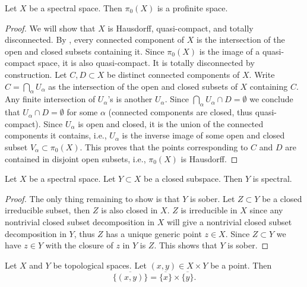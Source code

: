 \begin{lemma}
  \label{thm:pi0-profinite}
  Let $X$ be a spectral space. Then $\pi_0(X)$ is a profinite space.
\end{lemma}

\begin{proof}
  We will show that \(X\) is Hausdorff, quasi-compact, and totally disconnected.
  By , every connected component of \(X\) is the intersection of the open and closed subsets containing it. Since \(\pi_0(X)\) is the image of a quasi-compact space, it is also quasi-compact. It is totally disconnected by construction. Let \(C,D \subset X\) be distinct connected components of \(X\). Write \(C = \bigcap_{\alpha} U_\alpha\) as the intersection of the open and closed subsets of \(X\) containing \(C\). Any finite intersection of \(U_\alpha\)'s is another \(U_\alpha\). Since \(\bigcap_\alpha U_\alpha \cap D = \emptyset\) we conclude that \(U_\alpha \cap D = \emptyset\) for some \(\alpha\) (connected components are closed, thus quasi-compact). Since \(U_\alpha\) is open and closed, it is the union of the connected components it contains, i.e., \(U_\alpha\) is the inverse image of some open and closed subset \(V_\alpha \subset \pi_0(X)\). This proves that the points corresponding to \(C\) and \(D\) are contained in disjoint open subsets, i.e., \(\pi_0(X)\) is Hausdorff.
\end{proof}

\begin{lemma}
  \label{thm:closed-subspace-spectral}
  Let $X$ be a spectral space. Let $Y \subset X$ be a closed subspace. Then $Y$ is spectral.
\end{lemma}

\begin{proof}
  The only thing remaining to show is that $Y$ is sober. Let $Z \subset Y$ be a closed irreducible subset, then $Z$ is also closed in $X$. $Z$ is irreducible in $X$ since any nontrivial closed subset decomposition in $X$ will give a nontrivial closed subset decomposition in $Y$, thus $Z$ has a unique generic point $z \in X$. Since $Z \subset Y$ we have $z \in Y$ with the closure of $z$ in $Y$ is $Z$. This shows that $Y$ is sober.
\end{proof}

\begin{lemma}
  \label{thm:closure-product}
  Let $X$ and $Y$ be topological spaces. Let $(x, y) \in X \times Y$ be a point. Then 
  \[\overline{\{(x, y)\}} = \overline{\{x\}} \times \overline{\{y\}}.\]
\end{lemma}

